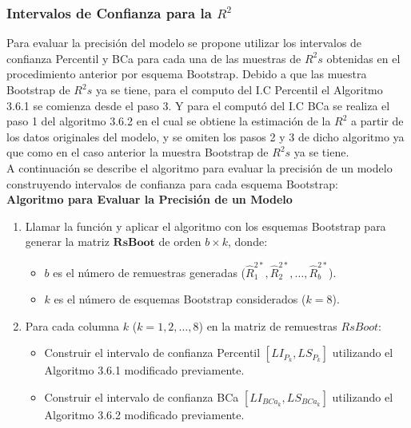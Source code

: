 \subsubsection{Intervalos de Confianza para la $R^{2}$}

Para evaluar la precisión del modelo se propone utilizar los intervalos de confianza Percentil y BCa para cada una de las muestras de $R^{2}s$ obtenidas en el procedimiento anterior por esquema Bootstrap. Debido a que las muestra Bootstrap de $R^{2}s$ ya se tiene, para el computo del I.C Percentil el Algoritmo 3.6.1 se comienza desde el paso 3. Y para el computó del I.C BCa se realiza el paso 1 del algoritmo 3.6.2 en el cual se obtiene la estimación de la $R^{2}$ a partir de los datos originales del modelo, y se omiten los pasos 2 y 3 de dicho algoritmo ya que como en el caso anterior la muestra Bootstrap de $R^{2}s$ ya se tiene.\\



A continuación se describe el algoritmo para evaluar la precisión de un modelo construyendo intervalos de confianza para cada esquema Bootstrap:\\


\textbf{Algoritmo para Evaluar la Precisión de un Modelo}

\begin{enumerate}
	
	\item Llamar la función y aplicar el algoritmo con los esquemas Bootstrap para generar la matriz \( \mathbf{RsBoot} \) de orden \( b \times k \), donde:
	\begin{itemize}
		\item \( b \) es el número de remuestras generadas (\( \hat{R}^{2*}_{1}, \hat{R}^{2*}_{2}, \dots, \hat{R}^{2*}_{b} \)).
		\item \( k \) es el número de esquemas Bootstrap considerados (\( k = 8 \)).
	\end{itemize}
	
	\item Para cada columna \( k \) (\( k = 1, 2, \dots, 8 \)) en la matriz de remuestras \( RsBoot \):
	\begin{itemize}
		\item Construir el intervalo de confianza Percentil \( [LI_{P_k}, LS_{P_k}] \) utilizando el Algoritmo 3.6.1 modificado previamente.
		\item Construir el intervalo de confianza BCa \( [LI_{BCa_k}, LS_{BCa_k}] \) utilizando el Algoritmo 3.6.2 modificado previamente.
	\end{itemize}
\end{enumerate}





